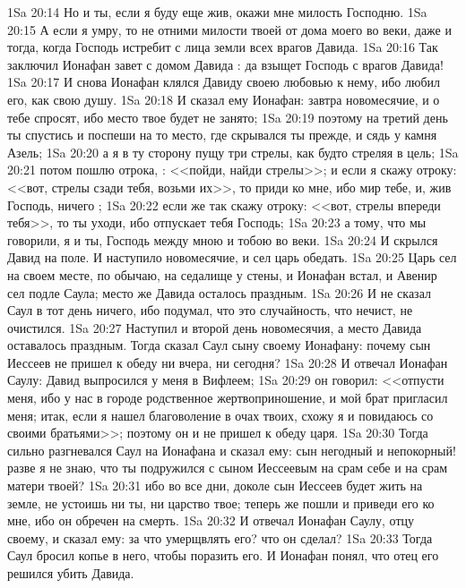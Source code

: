 \vs 1Sa 20:14 Но и ты, если я буду еще жив, окажи мне милость Господню.
\vs 1Sa 20:15 А если я умру, то не отними милости твоей от дома моего во веки, даже и тогда, когда Господь истребит с лица земли всех врагов Давида.
\vs 1Sa 20:16 Так заключил Ионафан завет с домом Давида : да взыщет Господь с врагов Давида!
\vs 1Sa 20:17 И снова Ионафан клялся Давиду своею любовью к нему, ибо любил его, как свою душу.
\vs 1Sa 20:18 И сказал ему Ионафан: завтра новомесячие, и о тебе спросят, ибо место твое будет не занято;
\vs 1Sa 20:19 поэтому на третий день ты спустись и поспеши на то место, где скрывался ты прежде, и сядь у камня Азель;
\vs 1Sa 20:20 а я в ту сторону пущу три стрелы, как будто стреляя в цель;
\vs 1Sa 20:21 потом пошлю отрока, : <<пойди, найди стрелы>>; и если я скажу отроку: <<вот, стрелы сзади тебя, возьми их>>, то приди ко мне, ибо мир тебе, и, жив Господь, ничего ;
\vs 1Sa 20:22 если же так скажу отроку: <<вот, стрелы впереди тебя>>, то ты уходи, ибо отпускает тебя Господь;
\vs 1Sa 20:23 а тому, что мы говорили, я и ты,  Господь между мною и тобою во веки.
\rsbpar\vs 1Sa 20:24 И скрылся Давид на поле. И наступило новомесячие, и сел царь обедать.
\vs 1Sa 20:25 Царь сел на своем месте, по обычаю, на седалище у стены, и Ионафан встал, и Авенир сел подле Саула; место же Давида осталось праздным.
\vs 1Sa 20:26 И не сказал Саул в тот день ничего, ибо подумал, что это случайность, что  нечист, не очистился.
\vs 1Sa 20:27 Наступил и второй день новомесячия, а место Давида оставалось праздным. Тогда сказал Саул сыну своему Ионафану: почему сын Иессеев не пришел к обеду ни вчера, ни сегодня?
\vs 1Sa 20:28 И отвечал Ионафан Саулу: Давид выпросился у меня в Вифлеем;
\vs 1Sa 20:29 он говорил: <<отпусти меня, ибо у нас в городе родственное жертвоприношение, и мой брат пригласил меня; итак, если я нашел благоволение в очах твоих, схожу я и повидаюсь со своими братьями>>; поэтому он и не пришел к обеду царя.
\vs 1Sa 20:30 Тогда сильно разгневался Саул на Ионафана и сказал ему: сын негодный и непокорный! разве я не знаю, что ты подружился с сыном Иессеевым на срам себе и на срам матери твоей?
\vs 1Sa 20:31 ибо во все дни, доколе сын Иессеев будет жить на земле, не устоишь ни ты, ни царство твое; теперь же пошли и приведи его ко мне, ибо он обречен на смерть.
\vs 1Sa 20:32 И отвечал Ионафан Саулу, отцу своему, и сказал ему: за что умерщвлять его? что он сделал?
\vs 1Sa 20:33 Тогда Саул бросил копье в него, чтобы поразить его. И Ионафан понял, что отец его решился убить Давида.
